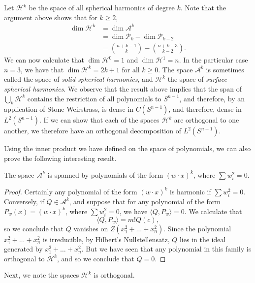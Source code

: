 Let $\mathcal{H}^k$ be the space of all spherical harmonics of degree $k$. Note that the argument above shows that for $k \geq 2$,
%
\begin{align*}
    \dim \mathcal{H}^k &= \dim \mathcal{A}^k\\
    &= \dim \mathcal{P}_k - \dim \mathcal{P}_{k-2}\\
    &= {n + k - 1 \choose k} - {n + k - 3 \choose k - 2}.
\end{align*}
%
We can now calculate that $\dim \mathcal{H}^0 = 1$ and $\dim \mathcal{H}^1 = n$. In the particular case $n = 3$, we have that $\dim \mathcal{H}^k = 2k+1$ for all $k \geq 0$. The space $\mathcal{A}^k$ is sometimes called the space of \emph{solid spherical harmonics}, and $\mathcal{H}^k$ the space of \emph{surface spherical harmonics}. We observe that the result above implies that the span of $\bigcup_k \mathcal{H}^k$ contains the restriction of all polynomials to $S^{n-1}$, and therefore, by an application of Stone-Weirstrass, is dense in $C(S^{n-1})$, and therefore, dense in $L^2(S^{n-1})$. If we can show that each of the spaces $\mathcal{H}^k$ are orthogonal to one another, we therefore have an orthogonal decomposition of $L^2(S^{n-1})$.

Using the inner product we have defined on the space of polynomials, we can also prove the following interesting result.

\begin{theorem}
    The space $\mathcal{A}^k$ is spanned by polynomials of the form $(w \cdot x)^k$, where $\sum w_i^2 = 0$.
\end{theorem}
\begin{proof}
    Certainly any polynomial of the form $(w \cdot x)^k$ is harmonic if $\sum w_i^2 = 0$. Conversely, if $Q \in \mathcal{A}^k$, and suppose that for any polynomial of the form $P_w(x) = (w \cdot x)^k$, where $\sum w_i^2 = 0$, we have $\langle Q, P_w \rangle = 0$. We calculate that
    \[ \langle Q, P_w \rangle = m! Q(c), \]
    so we conclude that $Q$ vanishes on $Z(x_1^2 + \dots + x_n^2)$. Since the polynomial $x_1^2 + \dots + x_n^2$ is irreducible, by Hilbert's Nullstellensatz, $Q$ lies in the ideal generated by $x_1^2 + \dots + x_n^2$. But we have seen that any polynomial in this family is orthogonal to $\mathcal{H}^k$, and so we conclude that $Q = 0$.
\end{proof}

Next, we note the spaces $\mathcal{H}^k$ is orthogonal.

